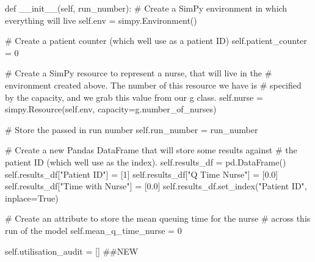 \documentclass[
  letterpaper,
  DIV=11,
  numbers=noendperiod]{scrreprt}
\newenvironment{Shaded}{\begin{snugshade}}{\end{snugshade}}
\newcommand{\CommentTok}[1]{\textcolor[rgb]{0.37,0.37,0.37}{#1}}
\newcommand{\DecValTok}[1]{\textcolor[rgb]{0.68,0.00,0.00}{#1}}
\newcommand{\FloatTok}[1]{\textcolor[rgb]{0.68,0.00,0.00}{#1}}
\newcommand{\FunctionTok}[1]{\textcolor[rgb]{0.28,0.35,0.67}{#1}}
\newcommand{\KeywordTok}[1]{\textcolor[rgb]{0.00,0.23,0.31}{#1}}
\newcommand{\NormalTok}[1]{\textcolor[rgb]{0.00,0.23,0.31}{#1}}
\newcommand{\OperatorTok}[1]{\textcolor[rgb]{0.37,0.37,0.37}{#1}}
\newcommand{\StringTok}[1]{\textcolor[rgb]{0.13,0.47,0.30}{#1}}
\newcommand{\VariableTok}[1]{\textcolor[rgb]{0.07,0.07,0.07}{#1}}
\begin{document}
\begin{Shaded}
\begin{Highlighting}[]
\KeywordTok{def} \FunctionTok{\_\_init\_\_}\NormalTok{(}\VariableTok{self}\NormalTok{, run\_number):}
    \CommentTok{\# Create a SimPy environment in which everything will live}
    \VariableTok{self}\NormalTok{.env }\OperatorTok{=}\NormalTok{ simpy.Environment()}

    \CommentTok{\# Create a patient counter (which we\textquotesingle{}ll use as a patient ID)}
    \VariableTok{self}\NormalTok{.patient\_counter }\OperatorTok{=} \DecValTok{0}

    \CommentTok{\# Create a SimPy resource to represent a nurse, that will live in the}
    \CommentTok{\# environment created above.  The number of this resource we have is}
    \CommentTok{\# specified by the capacity, and we grab this value from our g class.}
    \VariableTok{self}\NormalTok{.nurse }\OperatorTok{=}\NormalTok{ simpy.Resource(}\VariableTok{self}\NormalTok{.env, capacity}\OperatorTok{=}\NormalTok{g.number\_of\_nurses)}

    \CommentTok{\# Store the passed in run number}
    \VariableTok{self}\NormalTok{.run\_number }\OperatorTok{=}\NormalTok{ run\_number}

    \CommentTok{\# Create a new Pandas DataFrame that will store some results against}
    \CommentTok{\# the patient ID (which we\textquotesingle{}ll use as the index).}
    \VariableTok{self}\NormalTok{.results\_df }\OperatorTok{=}\NormalTok{ pd.DataFrame()}
    \VariableTok{self}\NormalTok{.results\_df[}\StringTok{"Patient ID"}\NormalTok{] }\OperatorTok{=}\NormalTok{ [}\DecValTok{1}\NormalTok{]}
    \VariableTok{self}\NormalTok{.results\_df[}\StringTok{"Q Time Nurse"}\NormalTok{] }\OperatorTok{=}\NormalTok{ [}\FloatTok{0.0}\NormalTok{]}
    \VariableTok{self}\NormalTok{.results\_df[}\StringTok{"Time with Nurse"}\NormalTok{] }\OperatorTok{=}\NormalTok{ [}\FloatTok{0.0}\NormalTok{]}
    \VariableTok{self}\NormalTok{.results\_df.set\_index(}\StringTok{"Patient ID"}\NormalTok{, inplace}\OperatorTok{=}\VariableTok{True}\NormalTok{)}

    \CommentTok{\# Create an attribute to store the mean queuing time for the nurse}
    \CommentTok{\# across this run of the model}
    \VariableTok{self}\NormalTok{.mean\_q\_time\_nurse }\OperatorTok{=} \DecValTok{0}

    \VariableTok{self}\NormalTok{.utilisation\_audit }\OperatorTok{=}\NormalTok{ [] }\CommentTok{\#\#NEW}
\end{Highlighting}
\end{Shaded}
\end{document}
